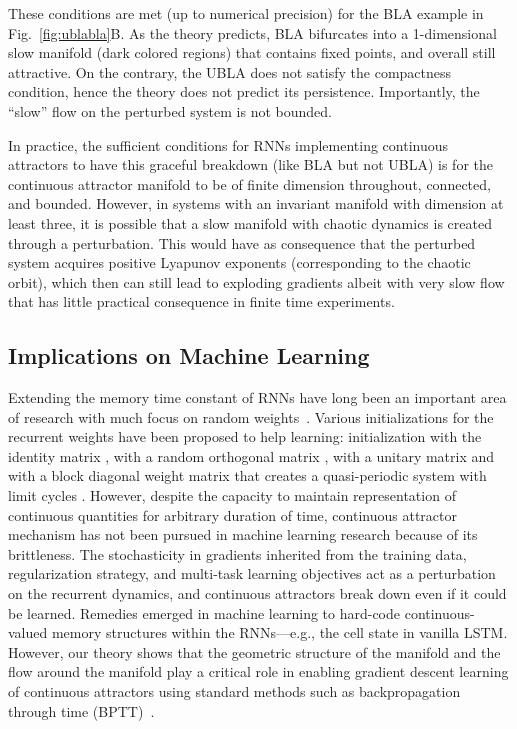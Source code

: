 \documentclass{article} %
\newcounter{ct}
\theoremstyle{definition}
\theoremstyle{remark}
\renewcommand{\cite}{\citep}
\begin{document}
These conditions are met (up to numerical precision) for the BLA example in Fig.~\ref{fig:ublabla}B.
As the theory predicts, BLA bifurcates into a 1-dimensional slow manifold (dark colored regions) that contains fixed points, and overall still attractive.
On the contrary, the UBLA does not satisfy the compactness condition, hence the theory does not predict its persistence.
Importantly, the ``slow'' flow on the perturbed system is not bounded.


In practice, the sufficient conditions for RNNs implementing continuous attractors to have this graceful breakdown (like BLA but not UBLA) is for the continuous attractor manifold to be of finite dimension throughout, connected, and bounded.
However, in systems with an invariant manifold with dimension at least three, it is possible that a slow manifold with chaotic dynamics is created through a perturbation. This would have as consequence that the perturbed system acquires positive Lyapunov exponents (corresponding to the chaotic orbit), which then can still lead to exploding gradients albeit with very slow flow that has little practical consequence in finite time experiments.

\subsection{Implications on Machine Learning}\label{sec:imp:ML}
Extending the memory time constant of RNNs have long been an important area of research with much focus on random weights~\cite{Legenstein2007,Goldman2009,Toyoizumi2011,Kerg2019,Chen2018,Henaff2016,Rusch2021,arjovsky2016}.
Various initializations for the recurrent weights have been proposed to help learning: initialization with the identity matrix \citep{le2015}, with a random orthogonal matrix \citep{saxe2014,Henaff2016}, with a unitary matrix \citep{arjovsky2016} and with a block diagonal weight matrix that creates a quasi-periodic system with limit cycles \citep{Sokol2019a}.
However, despite the capacity to maintain representation of continuous quantities for arbitrary duration of time, continuous attractor mechanism has not been pursued in machine learning research because of its brittleness.
The stochasticity in gradients inherited from the training data, regularization strategy, and multi-task learning objectives act as a perturbation on the recurrent dynamics, and continuous attractors break down even if it could be learned.
Remedies emerged in machine learning to hard-code continuous-valued memory structures within the RNNs---e.g., the cell state in vanilla LSTM.
However, our theory shows that the geometric structure of the manifold and the flow around the manifold play a critical role in enabling gradient descent learning of continuous attractors using standard methods such as backpropagation through time (BPTT)~\cite{Toomarian1991}.
\end{document}
